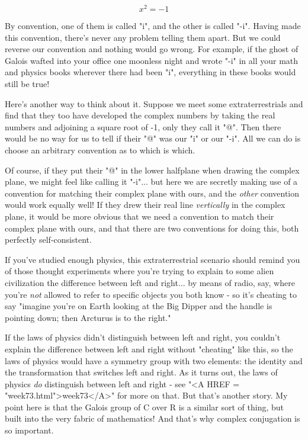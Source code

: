 $$

x^{2} = -1
$$
    
By convention, one of them is called "i", and the other is called
"-i".  Having made this convention, there's never any problem telling
them apart.  But we could reverse our convention and nothing would
go wrong.   For example, if the ghost of Galois wafted into your office
one moonless night and wrote "-i" in all your math and physics books 
wherever there had been "i", everything in these books would still be true!

Here's another way to think about it.  Suppose we meet some 
extraterrestrials and find that they too have developed the complex 
numbers by taking the real numbers and adjoining a square root of -1, 
only they call it "@".  Then there would be no way for us to tell if 
their "@" was our "i" or our "-i".  All we can do is choose an arbitrary
convention as to which is which.

Of course, if they put their "@" in the lower halfplane when 
drawing the 
complex plane, we might feel like calling it "-i"... but here we are 
secretly making use of a convention for matching their complex plane with 
ours, and the \emph{other} convention would work equally well!  If they drew 
their real line \emph{vertically} in the complex plane, it would be more 
obvious that we need a convention to match their complex plane with ours, 
and that there are two conventions for doing this, both perfectly 
self-consistent.  

If you've studied enough physics, this extraterrestrial scenario 
should remind you of those thought experiments where you're trying to
explain to some alien civilization the difference between left and
right... by means of radio, say, where you're \emph{not} allowed to refer
to specific objects you both know - so it's cheating to say "imagine 
you're on Earth looking at the Big Dipper and the handle is pointing 
down; then Arcturus is to the right."  

If the laws of physics didn't distinguish between left and right, 
you couldn't explain the difference between left and right without 
"cheating" like this, so the laws of physics would have a symmetry 
group with two elements: the identity and the transformation that 
switches left and right.  As it turns out, the laws of physics \emph{do}
distinguish between left and right - see "<A HREF = "week73.html">week73</A>" for more on that.  
But that's another story.  My point here is that the Galois group of C 
over R is a similar sort of thing, but built into the very fabric of 
mathematics!  And that's why complex conjugation is so important.  

